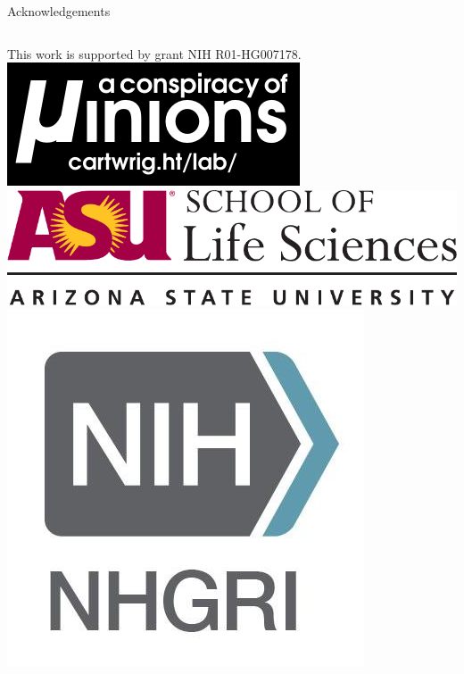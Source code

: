 \documentclass{beamer}
\begin{document}
\begin{frame}{}
\begin{columns}
\begin{block}{Acknowledgements}
\begin{columns}
This work is supported by grant NIH R01-HG007178.
\includegraphics[width=\linewidth]{lab_logo.pdf}
\includegraphics[width=\linewidth]{sols_logo.pdf}
\includegraphics[width=\linewidth]{nih-nhgri-official-logo.jpg}
\end{columns}


\end{block}

\end{columns}
\end{frame}
\end{document}
